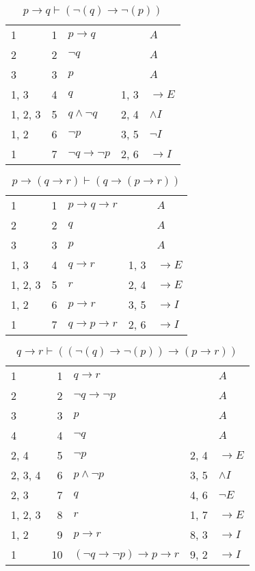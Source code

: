 \documentclass{article}
\begin{document}
\begin{table}[htbp]
\end{table}\begin{table}[htbp]\caption*{$p→q ⊢ (¬(q)→ ¬(p))$}\centering\begin{tabular}{lrlll}
{1} & 1 & $p→q$ & {} & $A$ \\
{2} & 2 & $¬q$ & {} & $A$ \\
{3} & 3 & $p$ & {} & $A$ \\
{1, 3} & 4 & $q$ & {1, 3} & $→E$ \\
{1, 2, 3} & 5 & $q∧ ¬q$ & {2, 4} & $∧I$ \\
{1, 2} & 6 & $¬p$ & {3, 5} & $¬I$ \\
{1} & 7 & $¬q→ ¬p$ & {2, 6} & $→I$ \\
\end{tabular}
\end{table}\begin{table}[htbp]\caption*{$p→(q→r) ⊢ (q→(p→r))$}\centering\begin{tabular}{lrlll}
{1} & 1 & $p→q→r$ & {} & $A$ \\
{2} & 2 & $q$ & {} & $A$ \\
{3} & 3 & $p$ & {} & $A$ \\
{1, 3} & 4 & $q→r$ & {1, 3} & $→E$ \\
{1, 2, 3} & 5 & $r$ & {2, 4} & $→E$ \\
{1, 2} & 6 & $p→r$ & {3, 5} & $→I$ \\
{1} & 7 & $q→p→r$ & {2, 6} & $→I$ \\
\end{tabular}
\end{table}\begin{table}[htbp]\caption*{$q→r ⊢ ((¬(q)→ ¬(p))→ (p→r))$}\centering\begin{tabular}{lrlll}
{1} & 1 & $q→r$ & {} & $A$ \\
{2} & 2 & $¬q→ ¬p$ & {} & $A$ \\
{3} & 3 & $p$ & {} & $A$ \\
{4} & 4 & $¬q$ & {} & $A$ \\
{2, 4} & 5 & $¬p$ & {2, 4} & $→E$ \\
{2, 3, 4} & 6 & $p∧ ¬p$ & {3, 5} & $∧I$ \\
{2, 3} & 7 & $q$ & {4, 6} & $¬E$ \\
{1, 2, 3} & 8 & $r$ & {1, 7} & $→E$ \\
{1, 2} & 9 & $p→r$ & {8, 3} & $→I$ \\
{1} & 10 & $(¬q→ ¬p)→p→r$ & {9, 2} & $→I$ \\
\end{tabular}

\end{table}
\end{document}
